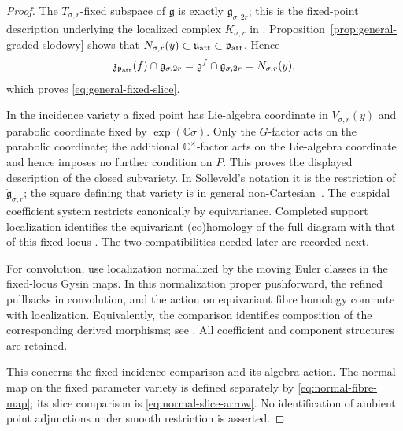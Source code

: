 \documentclass[11pt]{amsart}
\theoremstyle{definition}
\theoremstyle{remark}
\begin{document}
\begin{proof}
The $T_{\sigma,r}$-fixed subspace of $\mathfrak g$ is exactly
$\mathfrak g_{\sigma,2r}$; this is the fixed-point description underlying
the localized complex $K_{\sigma,r}$ in \cite[Section~2.1]{Solleveld}.
Proposition~\ref{prop:general-graded-slodowy} shows that
$N_{\sigma,r}(y)\subset\mathfrak u_{\rm att}\subset\mathfrak p_{\rm att}$.
Hence
\[
 \mathfrak z_{\mathfrak p_{\rm att}}(f)\cap\mathfrak g_{\sigma,2r}
 =\mathfrak g^f\cap\mathfrak g_{\sigma,2r}
 =N_{\sigma,r}(y),
\]
which proves \eqref{eq:general-fixed-slice}.

In the incidence variety a fixed point has Lie-algebra coordinate in
$V_{\sigma,r}(y)$ and parabolic coordinate fixed by
$\exp(\mathbb C\sigma)$.  Only the $G$-factor acts on the parabolic
coordinate; the additional $\mathbb C^\times$-factor acts on the
Lie-algebra coordinate and hence imposes no further condition on $P$.
This proves the displayed description of the closed subvariety.  In
Solleveld's notation it is the restriction of
$\dot{\mathfrak g}_{\sigma,r}$; the square defining that variety is in
general non-Cartesian~\cite[Section~2.1, equations (2.11)--(2.14)]{Solleveld}.
The cuspidal coefficient system restricts canonically by equivariance.
Completed support localization identifies the equivariant (co)homology of
the full diagram with that of this fixed locus
\cite[Theorem~6.2(1)--(3)]{GKM}.  The two compatibilities needed later are
recorded next.

For convolution, use localization normalized by the moving Euler
classes in the fixed-locus Gysin maps.  In this normalization proper
pushforward, the refined pullbacks in convolution, and the action on
equivariant fibre homology commute with localization.  Equivalently,
the comparison identifies composition of the corresponding derived
morphisms; see \cite[Proposition~2.4 and Theorem~2.5]{Solleveld}.
All coefficient and component structures are retained.

This concerns the fixed-incidence comparison and its algebra action.
The normal map on the fixed parameter variety is defined separately
by \eqref{eq:normal-fibre-map}; its slice comparison is
\eqref{eq:normal-slice-arrow}.  No identification of ambient point
adjunctions under smooth restriction is asserted.


\end{proof}
\end{document}
